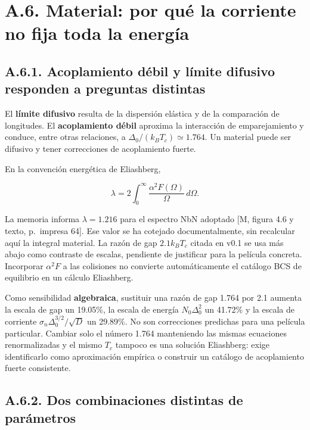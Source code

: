 \documentclass[
  spanish,
  10pt,
  a4paper,
]{article}
\begin{document}
\section{A.6. Material: por qué la corriente no fija toda la
energía}\label{a.6.-material-por-quuxe9-la-corriente-no-fija-toda-la-energuxeda}

\subsection{A.6.1. Acoplamiento débil y límite difusivo responden a
preguntas
distintas}\label{a.6.1.-acoplamiento-duxe9bil-y-luxedmite-difusivo-responden-a-preguntas-distintas}

El \textbf{límite difusivo} resulta de la dispersión elástica y de la
comparación de longitudes. El \textbf{acoplamiento débil} aproxima la
interacción de emparejamiento y conduce, entre otras relaciones, a
\(\Delta_0/(k_BT_c)\simeq1.764\). Un material puede ser difusivo y tener
correcciones de acoplamiento fuerte.

En la convención energética de Eliashberg,

\[
\lambda=2\int_0^\infty\frac{\alpha^2F(\Omega)}{\Omega}\,d\Omega.
\tag{A.32}
\]

La memoria informa \(\lambda=1.216\) para el espectro NbN adoptado {[}M,
figura 4.6 y texto, p.~impresa 64{]}. Ese valor se ha cotejado
documentalmente, sin recalcular aquí la integral material. La razón de
gap \(2.1k_BT_c\) citada en v0.1 se usa más abajo como contraste de
escalas, pendiente de justificar para la película concreta. Incorporar
\(\alpha^2F\) a las colisiones no convierte automáticamente el catálogo
BCS de equilibrio en un cálculo Eliashberg.

Como sensibilidad \textbf{algebraica}, sustituir una razón de gap 1.764
por 2.1 aumenta la escala de gap un 19.05\%, la escala de energía
\(N_0\Delta_0^2\) un 41.72\% y la escala de corriente
\(\sigma_n\Delta_0^{3/2}/\sqrt D\) un 29.89\%. No son correcciones
predichas para una película particular. Cambiar solo el número 1.764
manteniendo las mismas ecuaciones renormalizadas y el mismo \(T_c\)
tampoco es una solución Eliashberg: exige identificarlo como
aproximación empírica o construir un catálogo de acoplamiento fuerte
consistente.

\subsection{A.6.2. Dos combinaciones distintas de
parámetros}\label{a.6.2.-dos-combinaciones-distintas-de-paruxe1metros}
\end{document}
